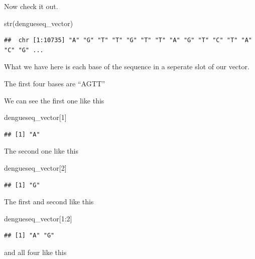 \documentclass[
]{book}
\newenvironment{Shaded}{\begin{snugshade}}{\end{snugshade}}
\newcommand{\DecValTok}[1]{\textcolor[rgb]{0.00,0.00,0.81}{#1}}
\newcommand{\FunctionTok}[1]{\textcolor[rgb]{0.00,0.00,0.00}{#1}}
\newcommand{\NormalTok}[1]{#1}
\newcommand{\SpecialCharTok}[1]{\textcolor[rgb]{0.00,0.00,0.00}{#1}}
\begin{document}
Now check it out.

\begin{Shaded}
\begin{Highlighting}[]
\FunctionTok{str}\NormalTok{(dengueseq\_vector)}
\end{Highlighting}
\end{Shaded}

\begin{verbatim}
##  chr [1:10735] "A" "G" "T" "T" "G" "T" "T" "A" "G" "T" "C" "T" "A" "C" "G" ...
\end{verbatim}

What we have here is each base of the sequence in a seperate slot of our vector.

The first four bases are ``AGTT''

We can see the first one like this

\begin{Shaded}
\begin{Highlighting}[]
\NormalTok{dengueseq\_vector[}\DecValTok{1}\NormalTok{]}
\end{Highlighting}
\end{Shaded}

\begin{verbatim}
## [1] "A"
\end{verbatim}

The second one like this

\begin{Shaded}
\begin{Highlighting}[]
\NormalTok{dengueseq\_vector[}\DecValTok{2}\NormalTok{]}
\end{Highlighting}
\end{Shaded}

\begin{verbatim}
## [1] "G"
\end{verbatim}

The first and second like this

\begin{Shaded}
\begin{Highlighting}[]
\NormalTok{dengueseq\_vector[}\DecValTok{1}\SpecialCharTok{:}\DecValTok{2}\NormalTok{]}
\end{Highlighting}
\end{Shaded}

\begin{verbatim}
## [1] "A" "G"
\end{verbatim}

and all four like this
\end{document}
